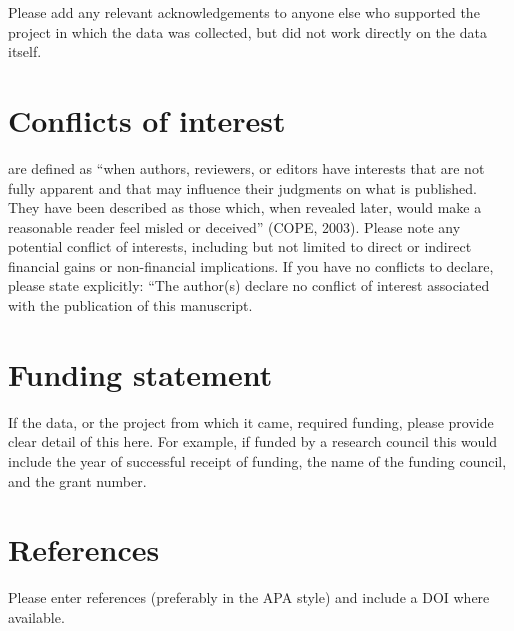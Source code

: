 \documentclass[
  letterpaper,
  DIV=11,
  numbers=noendperiod]{scrartcl}
\begin{document}
Please add any relevant acknowledgements to anyone else who supported
the project in which the data was collected, but did not work directly
on the data itself.

\section*{Conflicts of interest}\label{conflicts-of-interest}

are defined as ``when authors, reviewers, or editors have interests that
are not fully apparent and that may influence their judgments on what is
published. They have been described as those which, when revealed later,
would make a reasonable reader feel misled or deceived'' (COPE, 2003).
Please note any potential conflict of interests, including but not
limited to direct or indirect financial gains or non-financial
implications. If you have no conflicts to declare, please state
explicitly: ``The author(s) declare no conflict of interest associated
with the publication of this manuscript.

\section*{Funding statement}\label{funding-statement}

If the data, or the project from which it came, required funding, please
provide clear detail of this here. For example, if funded by a research
council this would include the year of successful receipt of funding,
the name of the funding council, and the grant number.

\newpage{}

\section*{References}\label{references}

Please enter references (preferably in the APA style) and include a DOI
where available.
\end{document}
